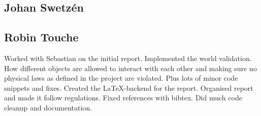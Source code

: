 \subsection*{Johan Swetz\'en}
\subsection*{Robin Touche}
Worked with Sebastian on the initial report.
\newline
\newline
Implemented the world validation.
How different objects are allowed to interact with each other and making sure no physical laws as defined in the project are violated.
Plus lots of minor code snippets and fixes.
\newline
\newline
Created the \LaTeX-backend for the report.
Organised report and made it follow regulations.
Fixed references with bibtex.
\newline
\newline
Did much code cleanup and documentation.
